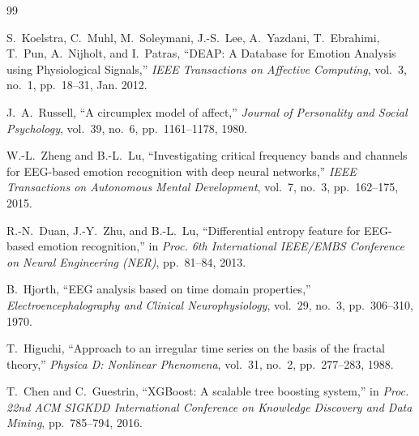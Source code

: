 \documentclass[12pt,a4paper]{report}
\begin{document}
\newpage
\begin{thebibliography}{99}

S.~Koelstra, C.~Muhl, M.~Soleymani, J.-S.~Lee, A.~Yazdani, T.~Ebrahimi,
T.~Pun, A.~Nijholt, and I.~Patras,
``DEAP: A Database for Emotion Analysis using Physiological Signals,''
\textit{IEEE Transactions on Affective Computing}, vol.~3, no.~1, pp.~18--31,
Jan. 2012.

J.~A.~Russell,
``A circumplex model of affect,''
\textit{Journal of Personality and Social Psychology}, vol.~39, no.~6,
pp.~1161--1178, 1980.

W.-L.~Zheng and B.-L.~Lu,
``Investigating critical frequency bands and channels for EEG-based emotion
recognition with deep neural networks,''
\textit{IEEE Transactions on Autonomous Mental Development}, vol.~7, no.~3,
pp.~162--175, 2015.

R.-N.~Duan, J.-Y.~Zhu, and B.-L.~Lu,
``Differential entropy feature for EEG-based emotion recognition,''
in \textit{Proc. 6th International IEEE/EMBS Conference on Neural Engineering
(NER)}, pp.~81--84, 2013.

B.~Hjorth,
``EEG analysis based on time domain properties,''
\textit{Electroencephalography and Clinical Neurophysiology}, vol.~29, no.~3,
pp.~306--310, 1970.

T.~Higuchi,
``Approach to an irregular time series on the basis of the fractal theory,''
\textit{Physica D: Nonlinear Phenomena}, vol.~31, no.~2, pp.~277--283, 1988.

T.~Chen and C.~Guestrin,
``XGBoost: A scalable tree boosting system,''
in \textit{Proc. 22nd ACM SIGKDD International Conference on Knowledge
Discovery and Data Mining}, pp.~785--794, 2016.


\end{thebibliography}


\end{document}
